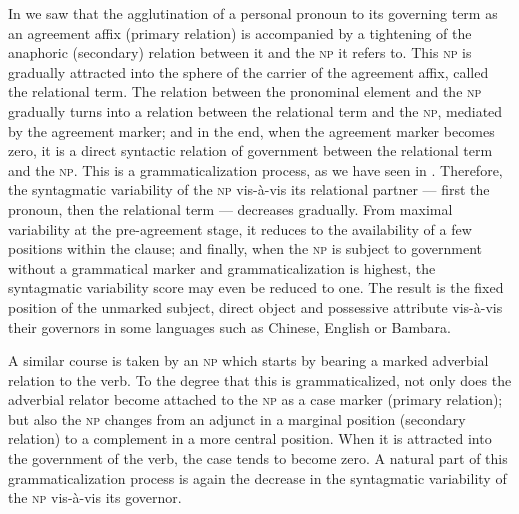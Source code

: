 In  we saw that the agglutination of a personal pronoun to its governing term as an agreement affix (primary relation) is accompanied by a tightening of the anaphoric (secondary) relation between it and the \textsc{np} it refers to. This \textsc{np} is gradually attracted into the sphere of the carrier of the agreement affix, called the relational term. The relation between the pronominal element and the \textsc{np} gradually turns into a relation between the relational term and the \textsc{np}, mediated by the agreement marker; and in the end, when the agreement marker becomes zero, it is a direct syntactic relation of government between the relational term and the \textsc{np}. This is a grammaticalization process, as we have seen in . Therefore, the syntagmatic variability of the \textsc{np} vis-à-vis its relational partner — first the pronoun, then the relational term — decreases gradually. From maximal variability at the pre-agreement stage, it reduces to the availability of a few positions within the clause; and finally, when the \textsc{np} is subject to government without a grammatical marker and grammaticalization is highest, the syntagmatic variability score may even be reduced to one. The result is the fixed position of the unmarked subject, direct object and possessive attribute vis-à-vis their governors in some languages such as Chinese, English or Bambara.

A similar course is taken by an \textsc{np} which starts by bearing a marked adverbial relation to the verb. To the degree that this is grammaticalized, not only does the adverbial relator become attached to the \textsc{np} as a case marker (primary relation); but also the \textsc{np} changes from an adjunct in a marginal position (secondary relation) to a complement in a more central position. When it is attracted into the government of the verb, the case tends to become zero. A natural part of this grammaticalization process is again the decrease in the syntagmatic variability of the \textsc{np} vis-à-vis its governor.

